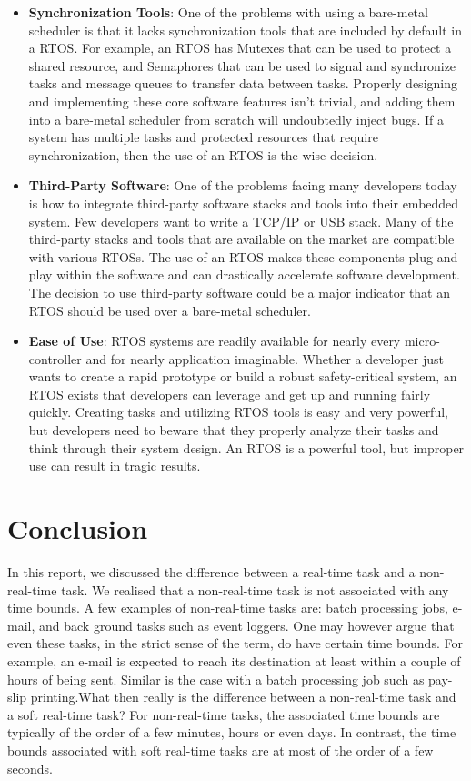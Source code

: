 \documentclass[12pt]{report}
\begin{document}
\begin{itemize}
    \item \textbf{Synchronization Tools}: One of the problems with using a bare-metal scheduler is that it lacks synchronization tools that are included by default in a RTOS. For example, an RTOS has Mutexes that can be used to protect a shared resource, and Semaphores that can be used to signal and synchronize tasks and message queues to transfer data between tasks. Properly designing and implementing these core software features isn't trivial, and adding them into a bare-metal scheduler from scratch will undoubtedly inject bugs. If a system has multiple tasks and protected resources that require synchronization, then the use of an RTOS is the wise decision.
    \item \textbf{Third-Party Software}: One of the problems facing many developers today is how to integrate third-party software stacks and tools into their embedded system. Few developers want to write a TCP/IP or USB stack. Many of the third-party stacks and tools that are available on the market are compatible with various RTOSs. The use of an RTOS makes these components plug-and-play within the software and can drastically accelerate software development. The decision to use third-party software could be a major indicator that an RTOS should be used over a bare-metal scheduler.
    \item \textbf{Ease of Use}: RTOS systems are readily available for nearly every micro-controller and for nearly application imaginable. Whether a developer just wants to create a rapid prototype or build a robust safety-critical system, an RTOS exists that developers can leverage and get up and running fairly quickly. Creating tasks and utilizing RTOS tools is easy and very powerful, but developers need to beware that they properly analyze their tasks and think through their system design. An RTOS is a powerful tool, but improper use can result in tragic results.
\end{itemize}

\chapter{Conclusion}
In this report, we discussed the difference between a real-time task and a non-real-time task. We realised that a  non-real-time task is not associated with any time bounds.  A few examples of non-real-time tasks  are:  batch  processing  jobs,  e-mail,  and  back  ground  tasks  such  as  event  loggers.   One may however argue that even these tasks, in the strict sense of the term, do have certain time bounds.  For example, an e-mail is expected to reach its destination at least within a couple of hours of being sent.  Similar is the case with a batch processing job such as pay-slip printing.What then really is the difference between a non-real-time task and a soft real-time task?  For non-real-time  tasks,  the  associated  time  bounds  are  typically  of  the  order  of  a  few  minutes, hours or even days.  In contrast, the time bounds associated with soft real-time tasks are at most of the order of a few seconds. \\ 
\end{document}

